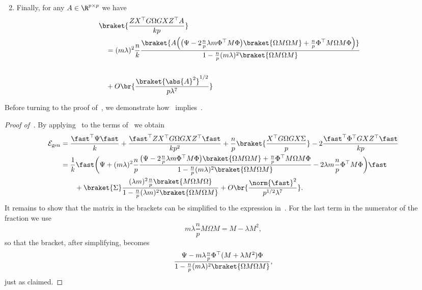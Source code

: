 \begin{proposition}
\begin{enumerate}
\begin{equation}
        \end{equation}
        \item\label{ZXGOmGXZ} Finally, for any $A\in\R^{p\times p}$ we have
        \begin{equation}
            \begin{split}
                &\braket{\frac{ZX^{\top}G\Omega G XZ^{\top}A}{kp}} \\
                &\quad = (m\lambda)^2\frac{n}{k}\frac{\braket{A\Bigl(\bigl( \Psi-2\frac{n}{p}\lambda m\Phi^\top M \Phi\bigr)\braket{ \Omega M \Omega M}+\frac{n}{p}\Phi^\top M\Omega M \Phi  \Bigr)}}{1- \frac{n}{p}(m\lambda)^2 \braket{\Omega M \Omega M}}\\
                \\ & \quad + O\br{\frac{\braket{\abs{A}^2}^{1/2}}{p\lambda^7}}
            \end{split}
        \end{equation}
    \end{enumerate}
\end{proposition}
Before turning to the proof of~, we demonstrate how~ implies~.
\begin{proof}[Proof of~]
    By applying~ to the terms of~ we obtain
    \begin{equation}
        \begin{split}
            \mathcal E_\mathrm{gen}&=\frac{\fast^\top\Psi\fast}{k} + \frac{\fast^\top Z X^\top G\Omega GX Z^\top \fast }{k p^2}
            +  \frac{n}{p}\braket{\frac{X^\top G\Omega GX\Sigma}{p}} -2 \frac{\fast^\top \Phi^\top G X Z^\top \fast}{kp}\\
            &= \frac{1}{k}\fast\biggl(\Psi + (m\lambda)^2\frac{n}{p}\frac{\bigl( \Psi-2\frac{n}{p}\lambda m\Phi^\top M \Phi\bigr)\braket{ \Omega M \Omega M}+\frac{n}{p}\Phi^\top M\Omega M \Phi  }{1- \frac{n}{p}(m\lambda)^2 \braket{\Omega M \Omega M}} - 2\lambda m\frac{ n}{p}\Phi^\top M\Phi \biggr)\fast\\
            &\qquad +\braket{\Sigma}  \frac{ (\lambda m)^2\frac{n}{p} \braket{ M\Omega M\Omega  }}{1-\frac{n}{p}(\lambda m)^2\braket{\Omega M\Omega M}}+ O\br{\frac{\norm{\fast}^2}{p^{1/2}\lambda^7}}.
        \end{split}
    \end{equation}
    It remains to show that the matrix in the brackets can be simplified to the expression in~. For the last term in the numerator of the fraction we use
    \begin{equation}
        m\lambda \frac{n}{p} M\Omega M= M -\lambda M^2,
    \end{equation}
    so that the bracket, after simplifying, becomes
    \begin{equation}
        \begin{split}
            \frac{\Psi -m\lambda\frac{n}{p}\Phi^\top (M+\lambda M^2) \Phi  }{1- \frac{n}{p}(m\lambda)^2 \braket{\Omega M \Omega M}},
        \end{split}
    \end{equation}
    just as claimed.
\end{proof}
